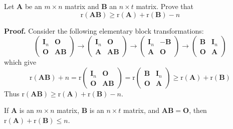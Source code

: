 \documentclass[12pt, a4paper, oneside]{book}
\begin{document}
\begin{corollary}
    Let $\mathbf{A}$ be an $m \times n$ matrix and $\mathbf{B}$ an $n \times t$ matrix. Prove that
    \[
        \mathrm{r}(\mathbf{A} \mathbf{B}) \geq \mathrm{r}(\mathbf{A})+\mathrm{r}(\mathbf{B})-n
    \]

    \textbf{Proof.} Consider the following elementary block transformations:
    \[
        \left(\begin{array}{cc}
                \mathbf{I}_n & \mathbf{O}            \\
                \mathbf{O}   & \mathbf{A} \mathbf{B}
            \end{array}\right) \rightarrow\left(\begin{array}{cc}
                \mathbf{I}_n & \mathbf{O}            \\
                \mathbf{A}   & \mathbf{A} \mathbf{B}
            \end{array}\right) \rightarrow\left(\begin{array}{cc}
                \mathbf{I}_n & -\mathbf{B} \\
                \mathbf{A}   & \mathbf{O}
            \end{array}\right) \rightarrow\left(\begin{array}{cc}
                \mathbf{B} & \mathbf{I}_n \\
                \mathbf{O} & \mathbf{A}
            \end{array}\right)
    \]
    which give
    \[
        \mathrm{r}(\mathbf{A} \mathbf{B})+n=\mathrm{r}\left(\begin{array}{cc}
                \mathbf{I}_n & \mathbf{O}            \\
                \mathbf{O}   & \mathbf{A} \mathbf{B}
            \end{array}\right)=\mathrm{r}\left(\begin{array}{cc}
                \mathbf{B} & \mathbf{I}_n \\
                \mathbf{O} & \mathbf{A}
            \end{array}\right) \geq \mathrm{r}(\mathbf{A})+\mathrm{r}(\mathbf{B})
    \]
    Thus $\mathrm{r}(\mathbf{A} \mathbf{B}) \geq \mathrm{r}(\mathbf{A})+\mathrm{r}(\mathbf{B})-n$.
\end{corollary}

\begin{corollary}
    If $\mathbf{A}$ is an $m \times n$ matrix, $\mathbf{B}$ is an $n \times t$ matrix, and ${\mathbf{A} \mathbf{B}}=\mathbf{O}$, then $\mathrm{r}(\mathbf{A})+\mathrm{r}(\mathbf{B}) \leq n$.
\end{corollary}
\end{document}
